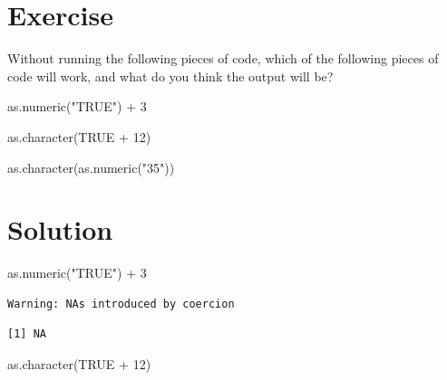 \documentclass[
  letterpaper,
  DIV=11,
  numbers=noendperiod]{scrreprt}
\newenvironment{Shaded}{\begin{snugshade}}{\end{snugshade}}
\newcommand{\ConstantTok}[1]{\textcolor[rgb]{0.56,0.35,0.01}{#1}}
\newcommand{\DecValTok}[1]{\textcolor[rgb]{0.68,0.00,0.00}{#1}}
\newcommand{\FunctionTok}[1]{\textcolor[rgb]{0.28,0.35,0.67}{#1}}
\newcommand{\NormalTok}[1]{\textcolor[rgb]{0.00,0.23,0.31}{#1}}
\newcommand{\SpecialCharTok}[1]{\textcolor[rgb]{0.37,0.37,0.37}{#1}}
\newcommand{\StringTok}[1]{\textcolor[rgb]{0.13,0.47,0.30}{#1}}
\begin{document}
\section{Exercise}

Without running the following pieces of code, which of the following
pieces of code will work, and what do you think the output will be?

\begin{Shaded}
\begin{Highlighting}[]
\FunctionTok{as.numeric}\NormalTok{(}\StringTok{"TRUE"}\NormalTok{) }\SpecialCharTok{+} \DecValTok{3}
\end{Highlighting}
\end{Shaded}

\begin{Shaded}
\begin{Highlighting}[]
\FunctionTok{as.character}\NormalTok{(}\ConstantTok{TRUE} \SpecialCharTok{+} \DecValTok{12}\NormalTok{)}
\end{Highlighting}
\end{Shaded}

\begin{Shaded}
\begin{Highlighting}[]
\FunctionTok{as.character}\NormalTok{(}\FunctionTok{as.numeric}\NormalTok{(}\StringTok{"35"}\NormalTok{))}
\end{Highlighting}
\end{Shaded}

\section{Solution}

\begin{Shaded}
\begin{Highlighting}[]
\FunctionTok{as.numeric}\NormalTok{(}\StringTok{"TRUE"}\NormalTok{) }\SpecialCharTok{+} \DecValTok{3}
\end{Highlighting}
\end{Shaded}

\begin{verbatim}
Warning: NAs introduced by coercion
\end{verbatim}

\begin{verbatim}
[1] NA
\end{verbatim}

\begin{Shaded}
\begin{Highlighting}[]
\FunctionTok{as.character}\NormalTok{(}\ConstantTok{TRUE} \SpecialCharTok{+} \DecValTok{12}\NormalTok{)}
\end{Highlighting}
\end{Shaded}
\end{document}
